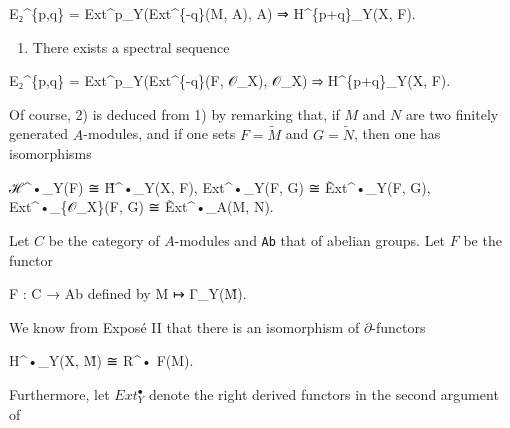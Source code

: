 \documentclass[
  11pt,
  a4paper,
]{book}
\newenvironment{Shaded}{}{}
\newcommand{\NormalTok}[1]{#1}
\providecommand{\tightlist}{%
  \setlength{\itemsep}{0pt}\setlength{\parskip}{0pt}}
\begin{document}
\begin{Shaded}
\begin{Highlighting}[]
\NormalTok{E₂\^{}\{p,q\} = Ext\^{}p\_Y(Ext\^{}\{{-}q\}(M, A), A) ⇒ H\^{}\{p+q\}\_Y(X, F).}
\end{Highlighting}
\end{Shaded}

\begin{enumerate}
\def\labelenumi{\arabic{enumi}.}
\tightlist
\item
  There exists a spectral sequence
\end{enumerate}

\begin{Shaded}
\begin{Highlighting}[]
\NormalTok{E₂\^{}\{p,q\} = Ext\^{}p\_Y(Ext\^{}\{{-}q\}(F, 𝒪\_X), 𝒪\_X) ⇒ H\^{}\{p+q\}\_Y(X, F).}
\end{Highlighting}
\end{Shaded}

Of course, 2) is deduced from 1) by remarking that, if \(M\) and \(N\)
are two finitely generated \(A\)-modules, and if one sets
\(F = \tilde{M}\) and \(G = \tilde{N}\), then one has isomorphisms

\begin{Shaded}
\begin{Highlighting}[]
\NormalTok{ℋ\^{}•\_Y(F) ≅ H̃\^{}•\_Y(X, F),}
\NormalTok{Ext\^{}•\_Y(F, G) ≅ Ẽxt\^{}•\_Y(F, G),}
\NormalTok{Ext\^{}•\_\{𝒪\_X\}(F, G) ≅ Ẽxt\^{}•\_A(M, N).}
\end{Highlighting}
\end{Shaded}

Let \(C\) be the category of \(A\)-modules and \texttt{Ab} that of
abelian groups. Let \(F\) be the functor

\begin{Shaded}
\begin{Highlighting}[]
\NormalTok{F : C → Ab    defined by    M ↦ Γ\_Y(M̃).}
\end{Highlighting}
\end{Shaded}

We know from Exposé II that there is an isomorphism of
\(\partial\)-functors

\begin{Shaded}
\begin{Highlighting}[]
\NormalTok{H\^{}•\_Y(X, M̃) ≅ R\^{}• F(M).}
\end{Highlighting}
\end{Shaded}

Furthermore, let \(Ext^{\bullet}_{Y}\) denote the right derived functors
in the second argument of
\end{document}
